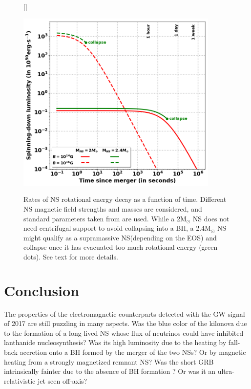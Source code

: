 \documentclass[11pt,onecolumn]{article}
\makeatletter
\newcommand{\gw}{GW\xspace}
\newcommand{\grb}{GRB\xspace}
\newcommand{\eos}{EOS\xspace}
\newcommand*{\ns}{NS\@\xspace}
\newcommand*{\nss}{NSs\@\xspace}
\newcommand*{\bh}{BH\@\xspace}
\makeatother
\begin{document}
\begin{figure}[!h]
\vspace*{-0.2cm}
[\FBwidth]
{\caption{Rates of \ns rotational energy decay as a function of time. Different \ns magnetic field strengths and masses are considered, and standard parameters taken from \citet{Metzger2017} are used. While a 2M$_{\odot}$ \ns does not need centrifugal support to avoid collapsing into a \bh, a 2.4M$_{\odot}$ \ns might qualify as a supramassive \ns (depending on the \eos) and collapse once it has evacuated too much rotational energy (green dots). See text for more details.}\label{fig:spinning_down}}
{\includegraphics[width=10cm]{Figures/spinning-down_luminosity.png}}
\end{figure}

\newpage

\section*{Conclusion}

The properties of the electromagnetic counterparts detected with the \gw signal of 2017 are still puzzling in many aspects. Was the blue color of the kilonova due to the formation of a long-lived \ns whose flux of neutrinos could have inhibited lanthanide nucleosynthesis? Was its high luminosity due to the heating by fall-back accretion onto a \bh formed by the merger of the two \nss? Or by magnetic heating from a strongly magnetized remnant \ns? Was the short \grb intrinsically fainter due to the absence of \bh formation \citep{Murguia-Berthier2017a}? Or was it an ultra-relativistic jet seen off-axis? \\
\end{document}
